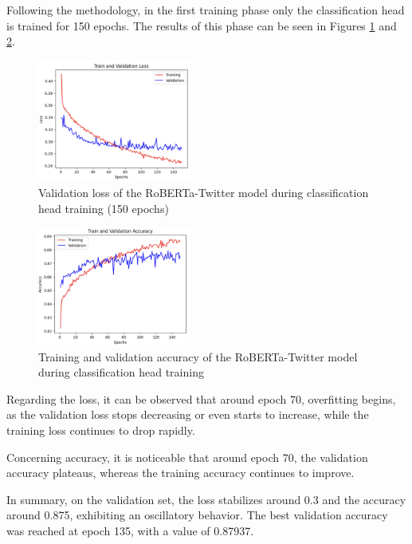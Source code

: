Following the methodology, in the first training phase only the classification head is trained for 150 epochs. The results of this phase can be seen in Figures \ref{fig:roberta_validation_loss_finetune} and \ref{fig:roberta_accuracy_finetune}.


\begin{figure}[H]
    \centering
    \includegraphics[width=0.45\textwidth]{images/robertaValidationLossFigureX15Epoch.png}
    \caption{Validation loss of the RoBERTa-Twitter model during classification head training (150 epochs)}
    \label{fig:roberta_validation_loss_finetune}
\end{figure}

\begin{figure}[H]
    \centering
    \includegraphics[width=0.45\textwidth]{images/robertaAccuracyFigureY150Epoch.png}
    \caption{Training and validation accuracy of the RoBERTa-Twitter model during classification head training}
    \label{fig:roberta_accuracy_finetune}
\end{figure}



Regarding the loss, it can be observed that around epoch 70, overfitting begins, as the validation loss stops decreasing or even starts to increase, while the training loss continues to drop rapidly. 

Concerning accuracy, it is noticeable that around epoch 70, the validation accuracy plateaus, whereas the training accuracy continues to improve. 

In summary, on the validation set, the loss stabilizes around 0.3 and the accuracy around 0.875, exhibiting an oscillatory behavior. The best validation accuracy was reached at epoch 135, with a value of 0.87937.

